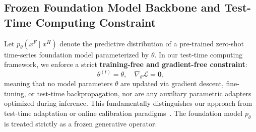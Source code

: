 \documentclass[preprint,12pt]{elsarticle}
\begin{document}
\subsection{Frozen Foundation Model Backbone and Test-Time Computing Constraint}
Let $p_\theta(x^F \mid x^H)$ denote the predictive distribution of a pre-trained zero-shot time-series foundation model parameterized by $\theta$. In our test-time computing framework, we enforce a strict \textbf{training-free and gradient-free constraint}:
\begin{equation}
\theta^{(t)} = \theta, \quad \nabla_\theta \mathcal{L} = \mathbf{0},
\label{eq:frozen_constraint}
\end{equation}
meaning that no model parameters $\theta$ are updated via gradient descent, fine-tuning, or test-time backpropagation, nor are any auxiliary parametric adapters optimized during inference. This fundamentally distinguishes our approach from test-time adaptation or online calibration paradigms~\citep{chen2025stttc, wang2026tta}. The foundation model $p_\theta$ is treated strictly as a frozen generative operator.
\end{document}

